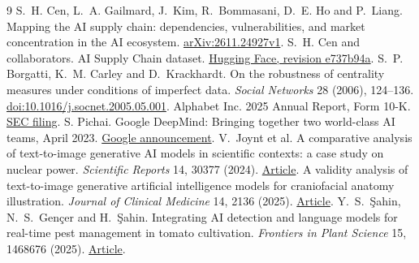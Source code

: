 \documentclass[11pt]{article}
\begin{document}
\begin{thebibliography}{9}\small
{} S.~H. Cen, L.~A. Gailmard, J.~Kim, R.~Bommasani, D.~E. Ho and P.~Liang. Mapping the AI supply chain: dependencies, vulnerabilities, and market concentration in the AI ecosystem. \href{https://arxiv.org/abs/2611.24927v1}{arXiv:2611.24927v1}.
 S.~H. Cen and collaborators. AI Supply Chain dataset. \href{https://huggingface.co/datasets/sarahcen/ai-supply-chain/tree/e737b94a38cf77b2ec3a29cb1c6bd756fb1329fb}{Hugging Face, revision e737b94a}.
 S.~P. Borgatti, K.~M. Carley and D.~Krackhardt. On the robustness of centrality measures under conditions of imperfect data. \emph{Social Networks} 28 (2006), 124--136. \href{https://doi.org/10.1016/j.socnet.2005.05.001}{doi:10.1016/j.socnet.2005.05.001}.
 Alphabet Inc. 2025 Annual Report, Form 10-K. \href{https://www.sec.gov/Archives/edgar/data/1652044/000165204426000018/goog-20251231.htm}{SEC filing}.
 S. Pichai. Google DeepMind: Bringing together two world-class AI teams, April 2023. \href{https://blog.google/technology/ai/april-ai-update/}{Google announcement}.
 V.~Joynt et al. A comparative analysis of text-to-image generative AI models in scientific contexts: a case study on nuclear power. \emph{Scientific Reports} 14, 30377 (2024). \href{https://doi.org/10.1038/s41598-024-79705-4}{Article}.
 A validity analysis of text-to-image generative artificial intelligence models for craniofacial anatomy illustration. \emph{Journal of Clinical Medicine} 14, 2136 (2025). \href{https://doi.org/10.3390/jcm14072136}{Article}.
 Y.~S.~\c{S}ahin, N.~S.~Gen\c{c}er and H.~\c{S}ahin. Integrating AI detection and language models for real-time pest management in tomato cultivation. \emph{Frontiers in Plant Science} 15, 1468676 (2025). \href{https://doi.org/10.3389/fpls.2024.1468676}{Article}.
\end{thebibliography}
\end{document}
